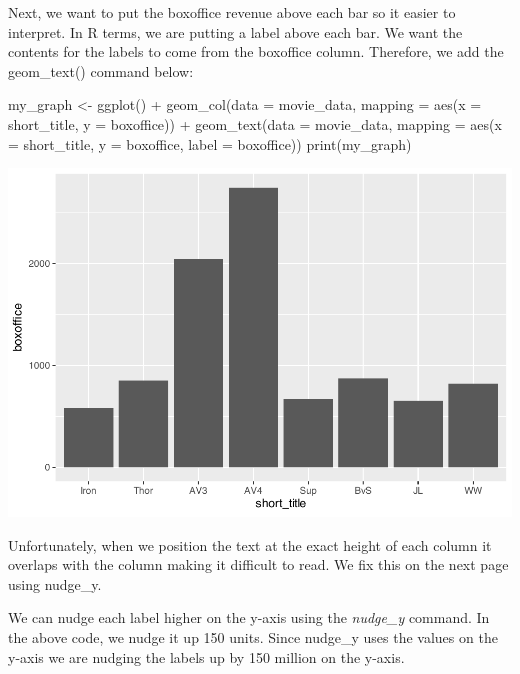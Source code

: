 \documentclass[
]{krantz}
\makeatletter
\newenvironment{Shaded}{\begin{snugshade}}{\end{snugshade}}
\newcommand{\AttributeTok}[1]{\textcolor[rgb]{0.61,0.61,0.61}{#1}}
\newcommand{\FunctionTok}[1]{\textcolor[rgb]{0,0,0}{#1}}
\newcommand{\NormalTok}[1]{#1}
\newcommand{\OtherTok}[1]{\textcolor[rgb]{0.37,0.37,0.37}{#1}}
\newcommand{\SpecialCharTok}[1]{\textcolor[rgb]{0,0,0}{#1}}
\newenvironment{kframe}{%
\medskip{}
\setlength{\fboxsep}{.8em}
 \def\at@end@of@kframe{}%
 \ifinner\ifhmode%
  \def\at@end@of@kframe{\end{minipage}}%
  \begin{minipage}{\columnwidth}%
 \fi\fi%
 \def\FrameCommand##1{\hskip\@totalleftmargin \hskip-\fboxsep
 \colorbox{shadecolor}{##1}\hskip-\fboxsep
     \hskip-\linewidth \hskip-\@totalleftmargin \hskip\columnwidth}%
 \MakeFramed {\advance\hsize-\width
   \@totalleftmargin\z@ \linewidth\hsize
   \@setminipage}}%
 {\par\unskip\endMakeFramed%
 \at@end@of@kframe}
\renewenvironment{Shaded}{\begin{kframe}}{\end{kframe}}
\makeatother
\begin{document}
Next, we want to put the boxoffice revenue above each bar so it easier to interpret. In R terms, we are putting a label above each bar. We want the contents for the labels to come from the boxoffice column. Therefore, we add the geom\_text() command below:

\begin{Shaded}
\begin{Highlighting}[]
\NormalTok{my\_graph }\OtherTok{\textless{}{-}} \FunctionTok{ggplot}\NormalTok{() }\SpecialCharTok{+}
  \FunctionTok{geom\_col}\NormalTok{(}\AttributeTok{data =}\NormalTok{ movie\_data,}
           \AttributeTok{mapping =} \FunctionTok{aes}\NormalTok{(}\AttributeTok{x =}\NormalTok{ short\_title, }
                         \AttributeTok{y =}\NormalTok{ boxoffice)) }\SpecialCharTok{+}
  \FunctionTok{geom\_text}\NormalTok{(}\AttributeTok{data =}\NormalTok{ movie\_data, }
           \AttributeTok{mapping =} \FunctionTok{aes}\NormalTok{(}\AttributeTok{x =}\NormalTok{ short\_title, }
                         \AttributeTok{y =}\NormalTok{ boxoffice, }
                         \AttributeTok{label =}\NormalTok{ boxoffice))}
\FunctionTok{print}\NormalTok{(my\_graph)}
\end{Highlighting}
\end{Shaded}

\includegraphics[width=0.65\linewidth]{bookdown_files/figure-latex/unnamed-chunk-110-1}

Unfortunately, when we position the text at the exact height of each column it overlaps with the column making it difficult to read. We fix this on the next page using nudge\_y.

We can nudge each label higher on the y-axis using the \emph{nudge\_y} command. In the above code, we nudge it up 150 units. Since nudge\_y uses the values on the y-axis we are nudging the labels up by 150 million on the y-axis.
\end{document}
